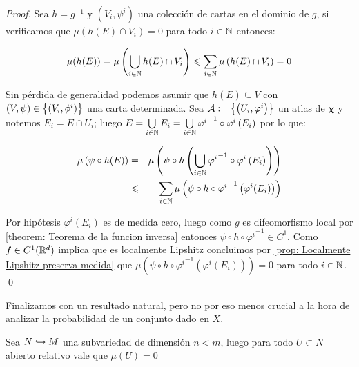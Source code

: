 \begin{proof}
	Sea $h = g^{-1}$ y $\left(V_i, \psi^i\right)$ una colecci\'on de cartas en el dominio de $g$, si verificamos que $\mu\left(h\left(E\right) \cap V_i\right) = 0$ para todo $i \in {\mathbb{N}}$ entonces:
	
	\begin{equation*}
	\mu(h(E)) = \mu \left(\bigcup\limits_{i \in {\mathbb{N}}}{h(E) \cap V_i}\right) \leqslant \sum\limits_{i \in {\mathbb{N}}}{\mu} \left(h(E) \cap V_i\right) = 0
	\end{equation*}
	
	Sin p\'erdida de generalidad podemos asumir que $h(E) \subseteq V$ con $(V, \psi) \in \left\lbrace(V_i, \phi^i)\right\rbrace$ una carta determinada. Sea $\mathcal{A} := \left\lbrace\left(U_i, \varphi^i \right)\right\rbrace$ un atlas de $\upchi$ y notemos $E_i = E \cap U_i$; luego $E = \bigcup\limits_{i \in {\mathbb{N}}}{E_i} = \bigcup\limits_{i \in {\mathbb{N}}}{{\varphi^i}^{-1} \circ \varphi^{i} \left(E_i\right)}$ por lo que:
	
	\begin{equation*}
	\begin{aligned}
	\mu\left(\psi \circ h(E)\right) & = & \mu \left(\psi \circ h \left(\bigcup\limits_{i \in {\mathbb{N}}}{{\varphi^i}^{-1} \circ \varphi^{i} \left(E_i\right)}\right)\right)\\
	& \leqslant & \sum\limits_{i \in {\mathbb{N}}}{\mu \left(\psi \circ h \circ {\varphi^{i}}^{-1} \left(\varphi^i (E_i)\right)\right)}
	\end{aligned}
	\end{equation*}
	
	Por hip\'otesis $\varphi^i(E_i)$ es de medida cero, luego como $g$ es difeomorfismo local por \ref{theorem: Teorema de la funcion inversa}  entonces $\psi \circ h \circ {\varphi^{i}}^{-1} \in C^1$. Como $f \in C^1({\mathbb{R}}^d)$ implica que es localmente Lipshitz concluimos por \ref{prop: Localmente Lipshitz preserva medida} que ${\mu \left(\psi \circ h \circ {\varphi^{i}}^{-1} \left(\varphi^i (E_i)\right)\right)} = 0$ para todo $i \in {\mathbb{N}}$. \qed
	
\end{proof}

Finalizamos con un resultado natural, pero no por eso menos crucial a la hora de analizar la probabilidad de un conjunto dado en $X$.

\begin{proposition}
	\label{prop: Dimension menor tiene medida 0}
	Sea $N \hookrightarrow M$ una subvariedad de dimensi\'on $n < m$, luego para todo $U \subset N$ abierto relativo vale que $\mu(U) = 0$
\end{proposition}

